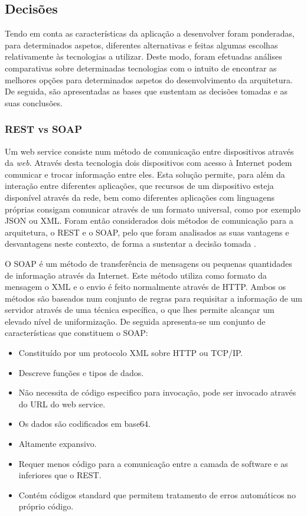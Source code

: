 \subsection{Decisões}

Tendo em conta as características da aplicação a desenvolver foram ponderadas, para determinados aspetos, diferentes alternativas e feitas algumas escolhas relativamente às tecnologias a utilizar. Deste modo, foram efetuadas análises comparativas sobre determinadas tecnologias com o intuito de encontrar as melhores opções para determinados aspetos do desenvolvimento da arquitetura. De seguida, são apresentadas as bases que sustentam as decisões tomadas e as suas conclusões.

\subsubsection{REST vs SOAP}
Um web service consiste num método de comunicação entre dispositivos através da \textit{web}. Através desta tecnologia dois dispositivos com acesso à Internet podem comunicar e trocar informação entre eles. Esta solução permite, para além da interação entre diferentes aplicações, que recursos de um dispositivo esteja disponível através da rede, bem como diferentes aplicações com linguagens próprias consigam comunicar através de um formato universal, como por exemplo JSON ou XML. Foram então considerados dois métodos de comunicação para a arquitetura, o REST e o SOAP, pelo que foram analisados as suas vantagens e desvantagens neste contexto, de forma a sustentar a decisão tomada \cite{mulligan2009comparison}.

O SOAP é um método de transferência de mensagens ou pequenas quantidades de informação através da Internet. Este método utiliza como formato da mensagem o XML e o envio é feito normalmente através de HTTP. Ambos os métodos são baseados num conjunto de regras para requisitar a informação de um servidor através de uma técnica específica, o que lhes permite alcançar um elevado nível de uniformização. De seguida apresenta-se um conjunto de características que constituem o SOAP:
\begin{itemize}
	\item Constituído por um protocolo XML sobre HTTP ou TCP/IP.
	\item Descreve funções e tipos de dados.
	\item Não necessita de código especifico para invocação, pode ser invocado através do URL do web service.
	\item Os dados são codificados em base64.
	\item Altamente expansivo.
	\item Requer menos código para a comunicação entre a camada de software e as inferiores que o REST.
	\item Contém códigos standard que permitem tratamento de erros automáticos no próprio código.
\end{itemize}

